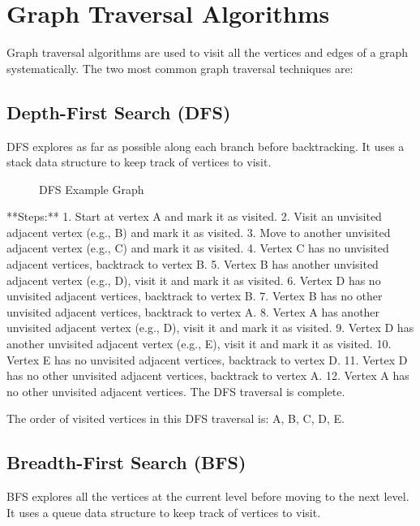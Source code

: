 \documentclass{article}
\begin{document}
\section{Graph Traversal Algorithms}
Graph traversal algorithms are used to visit all the vertices and edges of a graph systematically. The two most common graph traversal techniques are:

\subsection{Depth-First Search (DFS)}
DFS explores as far as possible along each branch before backtracking. It uses a stack data structure to keep track of vertices to visit.

\begin{figure}[h]
    \centering
    \caption{DFS Example Graph}
\end{figure}

**Steps:**
1. Start at vertex A and mark it as visited.
2. Visit an unvisited adjacent vertex (e.g., B) and mark it as visited.
3. Move to another unvisited adjacent vertex (e.g., C) and mark it as visited.
4. Vertex C has no unvisited adjacent vertices, backtrack to vertex B.
5. Vertex B has another unvisited adjacent vertex (e.g., D), visit it and mark it as visited.
6. Vertex D has no unvisited adjacent vertices, backtrack to vertex B.
7. Vertex B has no other unvisited adjacent vertices, backtrack to vertex A.
8. Vertex A has another unvisited adjacent vertex (e.g., D), visit it and mark it as visited.
9. Vertex D has another unvisited adjacent vertex (e.g., E), visit it and mark it as visited.
10. Vertex E has no unvisited adjacent vertices, backtrack to vertex D.
11. Vertex D has no other unvisited adjacent vertices, backtrack to vertex A.
12. Vertex A has no other unvisited adjacent vertices. The DFS traversal is complete.

The order of visited vertices in this DFS traversal is: A, B, C, D, E.

\subsection{Breadth-First Search (BFS)}
BFS explores all the vertices at the current level before moving to the next level. It uses a queue data structure to keep track of vertices to visit.
\end{document}
